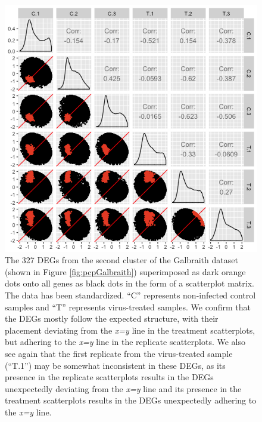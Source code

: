 \documentclass[11pt,a4paper,oldfontcommands,openany]{memoir}
\numberwithin{equation}{section} %
\begin{document}
\begin{figure}[H]
\begin{framed}
  \includegraphics[width=\textwidth]{Images/GalbraithClust2SM}
\end{framed}
  \caption{The 327 DEGs from the second cluster of the Galbraith dataset (shown in Figure \ref{fig:pcpGalbraith}) superimposed as dark orange dots onto all genes as black dots in the form of a scatterplot matrix. The data has been standardized. ``C'' represents non-infected control samples and ``T'' represents virus-treated samples. We confirm that the DEGs mostly follow the expected structure, with their placement deviating from the \textit{x=y} line in the treatment scatterplots, but adhering to the \textit{x=y} line in the replicate scatterplots. We also see again that the first replicate from the virus-treated sample (``T.1'') may be somewhat inconsistent in these DEGs, as its presence in the replicate scatterplots results in the DEGs unexpectedly deviating from the \textit{x=y} line and its presence in the treatment scatterplots results in the DEGs unexpectedly adhering to the \textit{x=y} line.}
  \label{fig:GalbraithClust2SM}
\end{figure}
\end{document}
